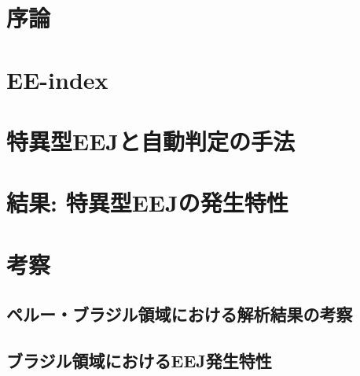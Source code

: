 \documentclass[a4paper,11pt]{ltjsarticle}
\begin{document}



\clearpage
\tableofcontents

\clearpage
\section{序論}







\clearpage
\section{EE-index}





\clearpage
\section{特異型EEJと自動判定の手法}







\clearpage
\section{結果: 特異型EEJの発生特性}
\label{sec:results}




\clearpage
\section{考察}
\subsection{ペルー・ブラジル領域における解析結果の考察}



\subsection{ブラジル領域におけるEEJ発生特性}


\end{document}
